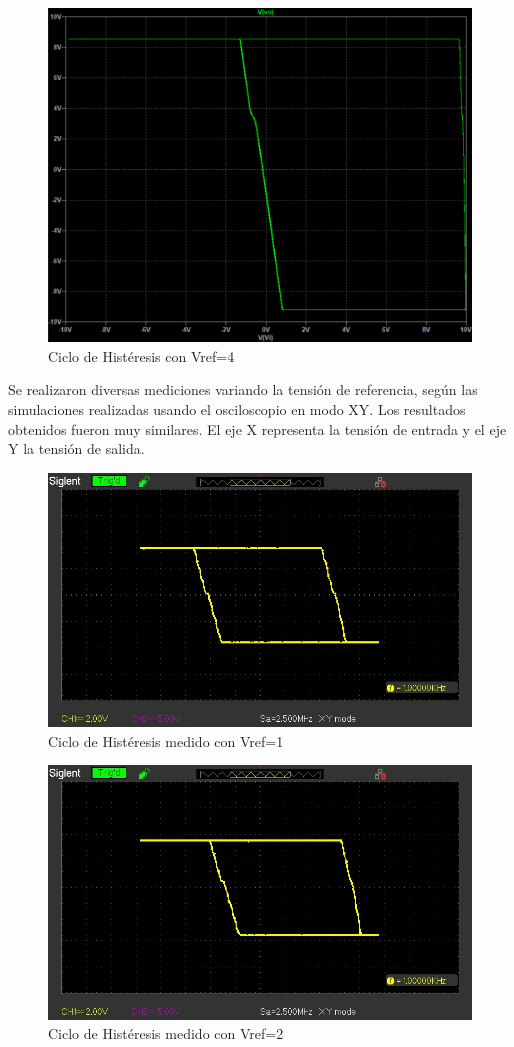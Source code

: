 \begin{figure}[H]
    \centering
    \includegraphics[width=0.75\linewidth]{Secciones/Circuito4/Circuito 4 - Vref4.png}
    \caption{Ciclo de Histéresis con Vref=4}
    \label{fig:Vref4}
\end{figure}

Se realizaron diversas mediciones variando la tensión de referencia, según las simulaciones realizadas usando el osciloscopio en modo XY. Los resultados obtenidos fueron muy similares. El eje X representa la tensión de entrada y el eje Y la tensión de salida.

\begin{figure}[H]
    \centering
    \includegraphics[width=0.75\linewidth]{Secciones/Circuito4/SDS00004.jpg}
    \caption{Ciclo de Histéresis medido con Vref=1}
    \label{fig:enter-label}
\end{figure}

\begin{figure}[H]
    \centering
    \includegraphics[width=0.75\linewidth]{Secciones/Circuito4/SDS00005.jpg}
    \caption{Ciclo de Histéresis medido con Vref=2}
    \label{fig:enter-label}
\end{figure}


